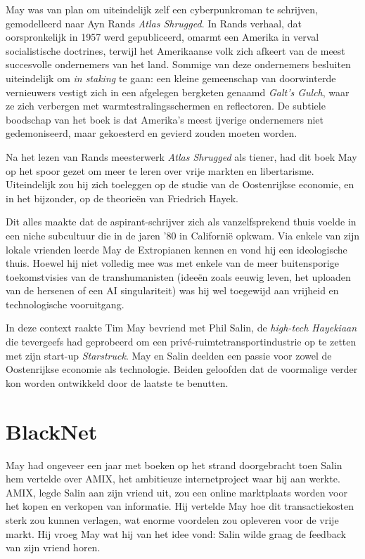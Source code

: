 \documentclass[
  a5paper,
  smalldemyvopaper,11pt,twoside,onecolumn,openright,extrafontsizes,
hidelinks]{memoir}
\begin{document}
May was van plan om uiteindelijk zelf een cyberpunkroman te schrijven,
gemodelleerd naar Ayn Rands \emph{Atlas Shrugged}. In Rands verhaal, dat
oorspronkelijk in 1957 werd gepubliceerd, omarmt een Amerika in verval
socialistische doctrines, terwijl het Amerikaanse volk zich afkeert van
de meest succesvolle ondernemers van het land. Sommige van deze
ondernemers besluiten uiteindelijk om \emph{in staking} te gaan: een
kleine gemeenschap van doorwinterde vernieuwers vestigt zich in een
afgelegen bergketen genaamd \emph{Galt's Gulch}, waar ze zich verbergen
met warmtestralingsschermen en reflectoren. De subtiele boodschap van
het boek is dat Amerika's meest ijverige ondernemers niet gedemoniseerd,
maar gekoesterd en gevierd zouden moeten worden.

Na het lezen van Rands meesterwerk \emph{Atlas Shrugged} als tiener, had
dit boek May op het spoor gezet om meer te leren over vrije markten en
libertarisme. Uiteindelijk zou hij zich toeleggen op de studie van de
Oostenrijkse economie, en in het bijzonder, op de theorieën van
Friedrich Hayek.

Dit alles maakte dat de aspirant-schrijver zich als vanzelfsprekend
thuis voelde in een niche subcultuur die in de jaren '80 in Californië
opkwam. Via enkele van zijn lokale vrienden leerde May de Extropianen
kennen en vond hij een ideologische thuis. Hoewel hij niet volledig mee
was met enkele van de meer buitensporige toekomstvisies van de
transhumanisten (ideeën zoals eeuwig leven, het uploaden van de hersenen
of een AI singulariteit) was hij wel toegewijd aan vrijheid en
technologische vooruitgang.

In deze context raakte Tim May bevriend met Phil Salin, de
\emph{high-tech Hayekiaan} die tevergeefs had geprobeerd om een
privé-ruimtetransportindustrie op te zetten met zijn start-up
\emph{Starstruck}. May en Salin deelden een passie voor zowel de
Oostenrijkse economie als technologie. Beiden geloofden dat de
voormalige verder kon worden ontwikkeld door de laatste te benutten.

\section{BlackNet}\label{blacknet}

May had ongeveer een jaar met boeken op het strand doorgebracht toen
Salin hem vertelde over AMIX, het ambitieuze internetproject waar hij
aan werkte. AMIX, legde Salin aan zijn vriend uit, zou een online
marktplaats worden voor het kopen en verkopen van informatie. Hij
vertelde May hoe dit transactiekosten sterk zou kunnen verlagen, wat
enorme voordelen zou opleveren voor de vrije markt. Hij vroeg May wat
hij van het idee vond: Salin wilde graag de feedback van zijn vriend
horen.
\end{document}
